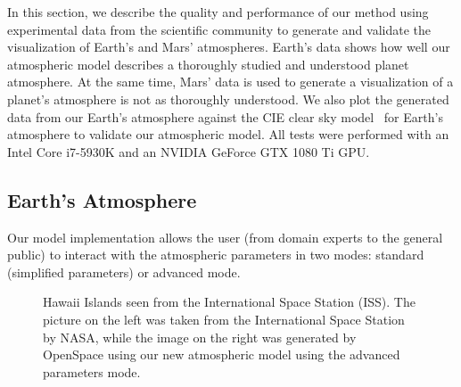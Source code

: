 \documentclass[journal]{vgtc}                %
\begin{document}
In this section, we describe the quality and performance of our method using experimental data from the scientific community to generate and validate the visualization of Earth's and Mars' atmospheres. 
Earth's data shows how well our atmospheric model describes a thoroughly studied and understood planet atmosphere. At the same time, Mars' data is used to generate a visualization of a planet's atmosphere is not as thoroughly understood. We also plot the generated data from our Earth's atmosphere against the CIE clear sky model~\cite{Darula:2002} for Earth's atmosphere to validate our atmospheric model. All tests were performed with an Intel Core i7-5930K and an NVIDIA GeForce GTX 1080 Ti GPU.

\vspace*{-1.5mm}
\subsection{Earth's Atmosphere}\label{sec:Earth_ATM}

Our model implementation allows the user (from domain experts to the general public) to interact with the atmospheric parameters in two modes: standard (simplified parameters) or advanced mode. 

\begin{figure}[t]
  \centering
  \vspace*{-6mm}
  \caption{Hawaii Islands seen from the International Space Station (ISS). The picture on the left was taken from the International Space Station by NASA, while the image on the right was generated by OpenSpace using our new atmospheric model using the advanced parameters mode.}
  \label{fig:Hawaii-comp}
  \vspace*{-3.5mm}
\end{figure}
\end{document}
